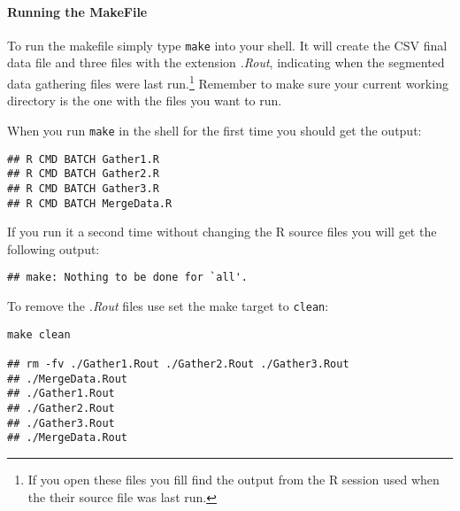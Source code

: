 \paragraph{Running the MakeFile}

To run the makefile simply type \texttt{make} into your shell. It will create the CSV final data file and three files with the extension \emph{.Rout}, indicating when the segmented data gathering files were last run.\footnote{If you open these files you fill find the output from the R session used when the their source file was last run.} Remember to make sure your current working directory is the one with the files you want to run. 

When you run \verb|make| in the shell for the first time you should get the output:

\begin{knitrout}
	\color{fgcolor}
	\begin{kframe}
		\begin{verbatim}
## R CMD BATCH Gather1.R
## R CMD BATCH Gather2.R
## R CMD BATCH Gather3.R
## R CMD BATCH MergeData.R
			\end{verbatim}
		\end{kframe}
\end{knitrout}

\noindent If you run it a second time without changing the R source files you will get the following output:

\begin{knitrout}
	\color{fgcolor}
	\begin{kframe}
		\begin{verbatim}
## make: Nothing to be done for `all'.
			\end{verbatim}
		\end{kframe}
\end{knitrout}

\noindent To remove the \emph{.Rout} files use set the make target to \texttt{clean}:

\begin{knitrout}
	\color{fgcolor}
	\begin{kframe}
		\begin{verbatim}
make clean

## rm -fv ./Gather1.Rout ./Gather2.Rout ./Gather3.Rout 
## ./MergeData.Rout
## ./Gather1.Rout
## ./Gather2.Rout
## ./Gather3.Rout
## ./MergeData.Rout
			\end{verbatim}
		\end{kframe}
\end{knitrout}


